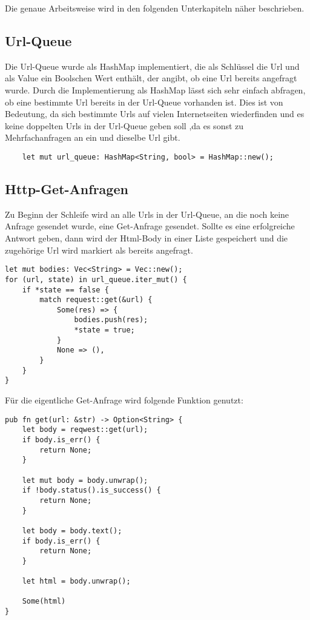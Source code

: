 Die genaue Arbeitsweise wird in den folgenden Unterkapiteln näher beschrieben.



\subsection{Url-Queue}
Die Url-Queue wurde als HashMap implementiert, die als Schlüssel die Url und
als Value ein Boolschen Wert enthält, der angibt, ob eine Url bereits
angefragt wurde. Durch die Implementierung als HashMap lässt sich sehr
einfach abfragen, ob eine bestimmte Url bereits in der Url-Queue vorhanden
ist. Dies ist von Bedeutung, da sich bestimmte Urls auf vielen Internetseiten
wiederfinden und es keine doppelten Urls in der Url-Queue geben soll ,da es sonst
zu Mehrfachanfragen an ein und dieselbe Url gibt.

\begin{verbatim}
    let mut url_queue: HashMap<String, bool> = HashMap::new();
\end{verbatim}


\subsection{Http-Get-Anfragen}
Zu Beginn der Schleife wird an alle Urls in der Url-Queue, an die noch keine
Anfrage gesendet wurde, eine Get-Anfrage gesendet. Sollte es eine erfolgreiche
Antwort geben, dann wird der Html-Body in einer Liste gespeichert und die
zugehörige Url wird markiert als bereits angefragt.

\begin{verbatim}
let mut bodies: Vec<String> = Vec::new();
for (url, state) in url_queue.iter_mut() {
    if *state == false {
        match request::get(&url) {
            Some(res) => {
                bodies.push(res);
                *state = true;
            }
            None => (),
        }
    }
}
\end{verbatim}

Für die eigentliche Get-Anfrage wird folgende Funktion genutzt:

\begin{verbatim}
pub fn get(url: &str) -> Option<String> {
    let body = reqwest::get(url);
    if body.is_err() {
        return None;
    }

    let mut body = body.unwrap();
    if !body.status().is_success() {
        return None;
    }

    let body = body.text();
    if body.is_err() {
        return None;
    }

    let html = body.unwrap();

    Some(html)
}
\end{verbatim}

